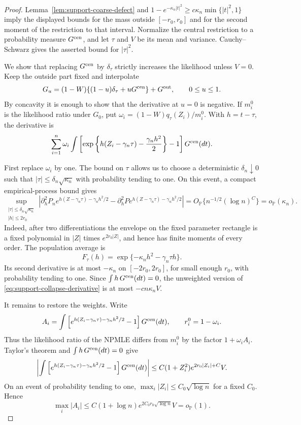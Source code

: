 \begin{proof}
Lemma~\ref{lem:support-coarse-defect} and
\(1-e^{-\kappa_n|t|^2}\ge c\kappa_n\min\{|t|^2,1\}\) imply the displayed
bounds for the mass outside \([-r_0,r_0]\) and for the second moment of the
restriction to that interval. Normalize the central restriction to a probability
measure \(G^{\rm cen}\), and let \(\tau\) and \(V\) be its mean and variance.
Cauchy--Schwarz gives the asserted bound for \(|\tau|^2\).

We show that replacing \(G^{\rm cen}\) by \(\delta_\tau\) strictly increases
the likelihood unless \(V=0\). Keep the outside part fixed and interpolate
\[
 G_u=(1-W)\{(1-u)\delta_\tau+uG^{\rm cen}\}+G^{\rm out},
 \qquad 0\le u\le1.
\]
By concavity it is enough to show that the derivative at \(u=0\) is negative.
If \(m_i^0\) is the likelihood ratio under \(G_0\), put
\(\omega_i=(1-W)q_\tau(Z_i)/m_i^0\). With \(h=t-\tau\), the derivative is
\begin{equation}
\label{eq:support-collapse-derivative}
 \sum_{i=1}^n\omega_i
 \int\left[
   \exp\left\{h(Z_i-\gamma_n\tau)
                   -\frac{\gamma_nh^2}{2}\right\}-1
 \right]G^{\rm cen}(dt).
\end{equation}

First replace \(\omega_i\) by one. The bound on \(\tau\) allows us to choose a
deterministic \(\delta_n\downarrow0\) such that
\(|\tau|\le\delta_n\sqrt{\kappa_n}\) with probability tending to one. On this
event, a compact empirical-process bound gives
\[
 \sup_{\substack{|\tau|\le\delta_n\sqrt{\kappa_n}\\|h|\le2r_0}}
 \left|
 \partial_h^2 P_n
 e^{h(Z-\gamma_n\tau)-\gamma_nh^2/2}
 -
 \partial_h^2 P
 e^{h(Z-\gamma_n\tau)-\gamma_nh^2/2}
 \right|
 =
 O_{\mathbb P}\{n^{-1/2}(\log n)^C\}
 =
 o_{\mathbb P}(\kappa_n).
\]
Indeed, after two differentiations the envelope on the fixed parameter
rectangle is a fixed polynomial in \(|Z|\) times \(e^{2r_0|Z|}\), and hence
has finite moments of every order. The population average is
\[
    F_\tau(h)=\exp\{-\kappa_nh^2-\gamma_n\tau h\}.
\]
Its second derivative is at most \(-\kappa_n\) on \([-2r_0,2r_0]\), for small enough
\(r_0\), with probability tending to one. Since
\(\int h\,G^{\rm cen}(dt)=0\), the unweighted version of
\eqref{eq:support-collapse-derivative} is at most
\(-cn\kappa_nV\).

It remains to restore the weights. Write
\[
    A_i=\int\left[
    e^{h(Z_i-\gamma_n\tau)-\gamma_nh^2/2}-1
    \right]G^{\rm cen}(dt),
    \qquad r_i^0=1-\omega_i.
\]
Thus the likelihood ratio of the NPMLE differs from \(m_i^0\) by the factor
\(1+\omega_iA_i\). Taylor's theorem and
\(\int h\,G^{\rm cen}(dt)=0\) give
\[
 \left|
 \int\left[
 e^{h(Z_i-\gamma_n\tau)-\gamma_nh^2/2}-1
 \right]G^{\rm cen}(dt)
 \right|
 \le
 C(1+Z_i^2)e^{2r_0|Z_i|+C}V.
\]
On an event of probability tending to one, \(\max_i|Z_i|\le C_0\sqrt{\log n}\)
for a fixed \(C_0\). Hence
\[
    \max_i|A_i|
    \le C(1+\log n)e^{2C_0r_0\sqrt{\log n}}V
    =o_{\mathbb P}(1).
\]


\end{proof}
